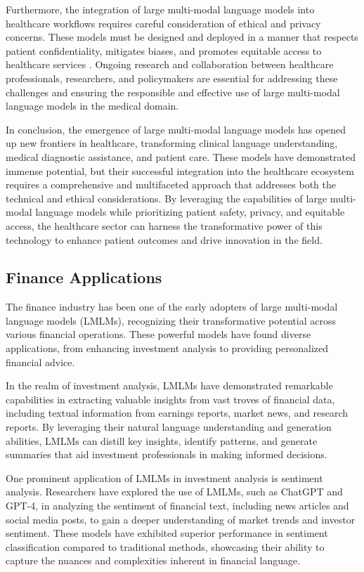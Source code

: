 \documentclass[11pt]{article}
\begin{document}
Furthermore, the integration of large multi-modal language models into healthcare workflows requires careful consideration of ethical and privacy concerns. These models must be designed and deployed in a manner that respects patient confidentiality, mitigates biases, and promotes equitable access to healthcare services \cite{ref14}. Ongoing research and collaboration between healthcare professionals, researchers, and policymakers are essential for addressing these challenges and ensuring the responsible and effective use of large multi-modal language models in the medical domain.

In conclusion, the emergence of large multi-modal language models has opened up new frontiers in healthcare, transforming clinical language understanding, medical diagnostic assistance, and patient care. These models have demonstrated immense potential, but their successful integration into the healthcare ecosystem requires a comprehensive and multifaceted approach that addresses both the technical and ethical considerations. By leveraging the capabilities of large multi-modal language models while prioritizing patient safety, privacy, and equitable access, the healthcare sector can harness the transformative power of this technology to enhance patient outcomes and drive innovation in the field.

\subsection{Finance Applications}

The finance industry has been one of the early adopters of large multi-modal language models (LMLMs), recognizing their transformative potential across various financial operations. These powerful models have found diverse applications, from enhancing investment analysis to providing personalized financial advice.

In the realm of investment analysis, LMLMs have demonstrated remarkable capabilities in extracting valuable insights from vast troves of financial data, including textual information from earnings reports, market news, and research reports. \cite{ref199} By leveraging their natural language understanding and generation abilities, LMLMs can distill key insights, identify patterns, and generate summaries that aid investment professionals in making informed decisions.

One prominent application of LMLMs in investment analysis is sentiment analysis. Researchers have explored the use of LMLMs, such as ChatGPT and GPT-4, in analyzing the sentiment of financial text, including news articles and social media posts, to gain a deeper understanding of market trends and investor sentiment. \cite{ref200} These models have exhibited superior performance in sentiment classification compared to traditional methods, showcasing their ability to capture the nuances and complexities inherent in financial language.
\end{document}

